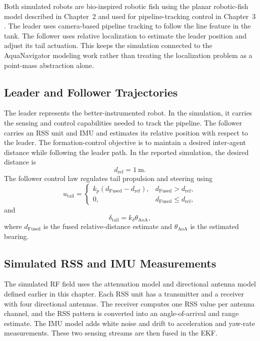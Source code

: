 \documentclass{uhcoethesis}
\begin{document}
Both simulated robots are bio-inspired robotic fish using the planar robotic-fish model described in Chapter~2 and used for pipeline-tracking control in Chapter~3 \cite{Masood2025Pipeline}. The leader uses camera-based pipeline tracking to follow the line feature in the tank. The follower uses relative localization to estimate the leader position and adjust its tail actuation. This keeps the simulation connected to the AquaNavigator modeling work rather than treating the localization problem as a point-mass abstraction alone.

\subsection{Leader and Follower Trajectories}

The leader represents the better-instrumented robot. In the simulation, it carries the sensing and control capabilities needed to track the pipeline. The follower carries an RSS unit and IMU and estimates its relative position with respect to the leader. The formation-control objective is to maintain a desired inter-agent distance while following the leader path. In the reported simulation, the desired distance is
\begin{equation}
    d_{\mathrm{ref}} = 1~\mathrm{m}.
    \label{eq:ch5_dref}
\end{equation}
The follower control law regulates tail propulsion and steering using
\begin{equation}
u_{\mathrm{tail}} =
\begin{cases}
k_p(d_{\mathrm{Fused}}-d_{\mathrm{ref}}), & d_{\mathrm{Fused}}>d_{\mathrm{ref}},\\
0, & d_{\mathrm{Fused}}\leq d_{\mathrm{ref}},
\end{cases}
\label{eq:ch5_tail_speed_control}
\end{equation}
and
\begin{equation}
    \delta_{\mathrm{tail}}=k_{\delta}\theta_{\mathrm{AoA}},
    \label{eq:ch5_tail_steering_control}
\end{equation}
where $d_{\mathrm{Fused}}$ is the fused relative-distance estimate and $\theta_{\mathrm{AoA}}$ is the estimated bearing.

\subsection{Simulated RSS and IMU Measurements}

The simulated RF field uses the attenuation model and directional antenna model defined earlier in this chapter. Each RSS unit has a transmitter and a receiver with four directional antennas. The receiver computes one RSS value per antenna channel, and the RSS pattern is converted into an angle-of-arrival and range estimate. The IMU model adds white noise and drift to acceleration and yaw-rate measurements. These two sensing streams are then fused in the EKF.
\end{document}
